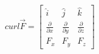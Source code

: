\documentclass[preview]{standalone}
\begin{document}
\begin{center}
$ curl \vec{F} = \begin{bmatrix} \hat{i} & \hat{j} & \hat{k}\\ \frac{\partial}{\partial x} & \frac{\partial}{\partial y} & \frac{\partial}{\partial z}\\ F_{x} & F_{y} & F_{z} \end{bmatrix}$
\end{center}
\end{document}
